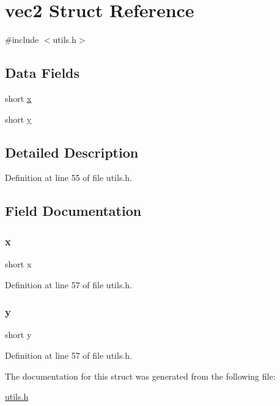 \hypertarget{structvec2}{}\section{vec2 Struct Reference}
\label{structvec2}


{\ttfamily \#include $<$utils.\+h$>$}

\subsection*{Data Fields}
\begin{DoxyCompactItemize}
\item 
short \mbox{\hyperlink{structvec2_ad34729e4edc23ac502eaa17b188df67b}{x}}
\item 
short \mbox{\hyperlink{structvec2_a34769302b056076dd9f0cd95de8c5d2f}{y}}
\end{DoxyCompactItemize}


\subsection{Detailed Description}


Definition at line 55 of file utils.\+h.



\subsection{Field Documentation}
\mbox{\label{structvec2_ad34729e4edc23ac502eaa17b188df67b}} 
\subsubsection{\texorpdfstring{x}{x}}
{\footnotesize\ttfamily short x}



Definition at line 57 of file utils.\+h.

\mbox{\label{structvec2_a34769302b056076dd9f0cd95de8c5d2f}} 
\subsubsection{\texorpdfstring{y}{y}}
{\footnotesize\ttfamily short y}



Definition at line 57 of file utils.\+h.



The documentation for this struct was generated from the following file\+:\begin{DoxyCompactItemize}
\item 
\mbox{\hyperlink{utils_8h}{utils.\+h}}\end{DoxyCompactItemize}
